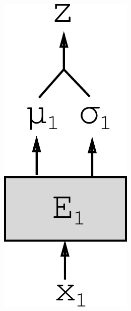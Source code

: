 \documentclass{article}
\begin{document}
\begin{figure}[h!]
\begin{subfigure}[b]{.10\linewidth}
        \includegraphics[width=.75\linewidth]{modelv2}
        \caption{}
        \label{fig:diagram:modelv2}
    \end{subfigure}\hspace{5mm}
    \begin{subfigure}[b]{.10\linewidth}

\end{subfigure}
\end{figure}
\end{document}
